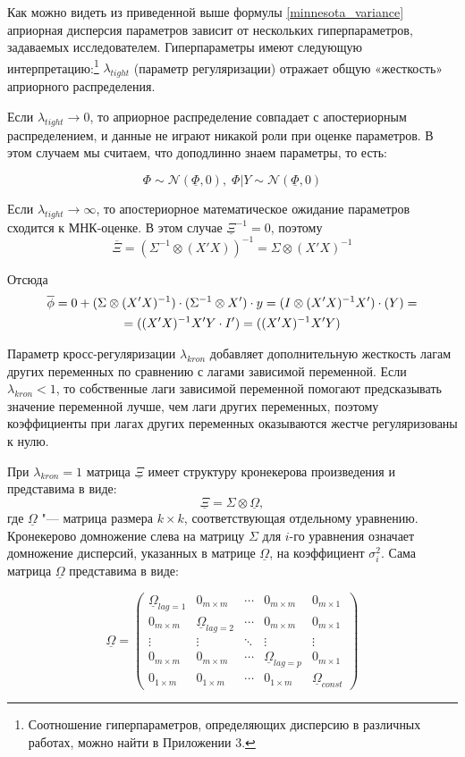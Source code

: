 \documentclass[11pt]{article} %
\newcommand{\cN}{\mathcal{N}}
\newcommand{\prior}{\underline}
\newcommand{\post}{\overline}
\let\vec\relax
\DeclareMathOperator{\vec}{vec}
\begin{document}
Как можно видеть из приведенной выше формулы \eqref{minnesota_variance} априорная дисперсия параметров зависит от нескольких гиперпараметров, задаваемых исследователем. Гиперпараметры имеют следующую интерпретацию:\footnote{Соотношение гиперпараметров, определяющих дисперсию в различных работах, можно найти в Приложении 3.} $\lambda_{tight}$ (параметр регуляризации) отражает общую «жесткость» априорного распределения.

Если $\lambda_{tight}\to 0$, то априорное распределение совпадает с апостериорным распределением, и данные не играют никакой роли при оценке параметров. В этом случаем мы считаем, что доподлинно знаем параметры, то есть:

\[
\Phi \sim \cN (\prior \Phi, 0), \; \Phi |Y \sim \cN (\prior \Phi, 0)
\]


Если $\lambda_{tight}\to \infty$, то апостериорное математическое ожидание параметров сходится к МНК-оценке. В этом случае $\prior \Xi^{-1} = 0$, поэтому
\[
\post \Xi = (\Sigma^{-1} \otimes (X'X))^{-1} = \Sigma \otimes (X'X)^{-1}
\]

Отсюда
\begin{multline}
\post\phi = 0 + (\Sigma \otimes (X'X)^{-1}) \cdot (\Sigma^{-1} \otimes X' )\cdot y=
(I \otimes (X'X)^{-1}X') \cdot \vec(Y) =\\
= \vec((X'X)^{-1}X'Y\cdot I')= \vec((X'X)^{-1}X'Y)
\end{multline}


Параметр кросс-регуляризации $\lambda_{kron}$ добавляет дополнительную жесткость лагам других переменных по сравнению с лагами зависимой переменной. Если  $\lambda_{kron}<1$, то собственные лаги зависимой переменной помогают предсказывать значение переменной лучше, чем лаги других переменных, поэтому коэффициенты при лагах других переменных оказываются жестче регуляризованы к нулю.

При $\lambda_{kron}=1$ матрица $\prior \Xi$ имеет структуру кронекерова произведения и представима в виде:
\[
\prior \Xi = \Sigma \otimes \prior \Omega,
\]
где $\prior \Omega$ "--- матрица размера $k\times k$, соответствующая отдельному уравнению. Кронекерово домножение слева на матрицу $\Sigma$ для $i$-го уравнения означает домножение дисперсий, указанных в матрице $\prior \Omega$, на коэффициент $\sigma^2_i$. Сама матрица $\prior \Omega$ представима в виде:


\begin{equation}
\prior \Omega=\begin{pmatrix} \label{prior_omega1}
\prior \Omega_{lag=1}&0_{m\times m}&\cdots&0_{m\times m}&0_{m\times 1}\\
0_{m\times m}& \prior\Omega_{lag=2}& \cdots &0_{m\times m}&0_{m\times 1}\\
\vdots &\vdots& \ddots&\vdots& \vdots\\
0_{m\times m}&0_{m\times m}&\cdots&\prior\Omega_{lag=p} & 0_{m\times 1}\\
0_{1\times m}&0_{1\times m}&\cdots&0_{1\times m}&\prior \Omega_{const}
\end{pmatrix}
\end{equation}
\end{document}

